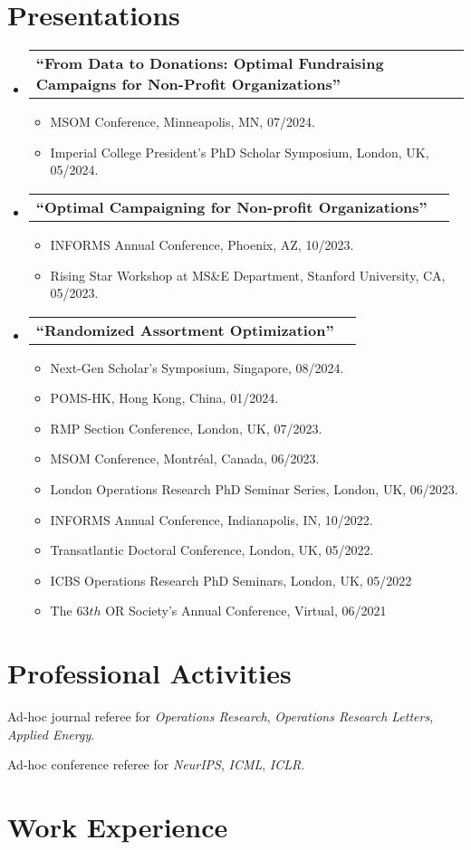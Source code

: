 \documentclass[letterpaper,11pt]{article}
\makeatletter
\newcommand{\resumeItem}[1]{
  \item\small{
    {#1 \vspace{-2pt}}
  }
}
\newcommand{\resumeProjectHeading}[2]{
    \item
    \begin{tabular*}{0.97\textwidth}{l@{\extracolsep{\fill}}r}
      \small #1 & #2 \\
    \end{tabular*}\vspace{-7pt}
}
\newcommand{\resumeSubHeadingListStart}{\begin{itemize}[leftmargin=0.15in, label={}]}
\newcommand{\resumeSubHeadingListEnd}{\end{itemize}}
\newcommand{\resumeItemListStart}{\begin{itemize}[label=--]}
\newcommand{\resumeItemListEnd}{\end{itemize}\vspace{-5pt}}
\makeatother
\begin{document}
\section{Presentations}


    \resumeSubHeadingListStart
     \resumeProjectHeading
    {\bf ``From Data to Donations: Optimal Fundraising Campaigns for Non-Profit Organizations''}{}
    \resumeItemListStart
   \resumeItem{MSOM Conference,  Minneapolis, MN, 07/2024.}
     \resumeItem{Imperial College President's PhD Scholar Symposium,  London,  UK, 05/2024.}
    \resumeItemListEnd
    \resumeProjectHeading
    {\bf ``Optimal Campaigning for Non-profit Organizations''}{}
    \resumeItemListStart
    \resumeItem{INFORMS Annual Conference, Phoenix, AZ, 10/2023.}
    \resumeItem{Rising Star Workshop at MS\&E Department, Stanford University,  CA, 05/2023.}
    \resumeItemListEnd
    \resumeProjectHeading
    {\bf ``Randomized Assortment Optimization''}{}
    \resumeItemListStart
    \resumeItem{Next-Gen Scholar's Symposium, Singapore, 08/2024.}
    \resumeItem{POMS-HK, Hong Kong, China, 01/2024.}
    \resumeItem{RMP Section Conference, London, UK, 07/2023.}    
    \resumeItem{MSOM Conference, Montr\'{e}al, Canada, 06/2023.}
    \resumeItem{London Operations Research PhD Seminar Series, London, UK, 06/2023.}
    \resumeItem{INFORMS Annual Conference, Indianapolis, IN, 10/2022.}
    \resumeItem{Transatlantic Doctoral Conference, London, UK, 05/2022.}
    \resumeItem{ICBS Operations Research PhD Seminars, London, UK, 05/2022}
    \resumeItem{The $63th$ OR Society's Annual Conference,  Virtual, 06/2021} 
    \resumeItemListEnd
    \resumeSubHeadingListEnd
    
\section{Professional Activities}

\quad Ad-hoc journal referee for \emph{Operations Research}, \emph{Operations Research Letters}, \emph{Applied Energy}.

\quad Ad-hoc conference referee for \emph{NeurIPS}, \emph{ICML}, \emph{ICLR}.

\section{Work Experience}
\end{document}
